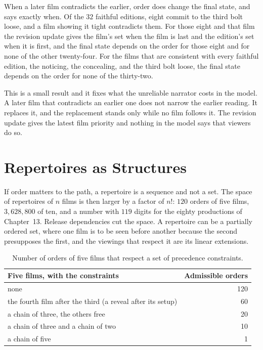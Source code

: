 \documentclass[11pt,twoside,openright]{book}
\theoremstyle{plain}
\theoremstyle{definition}
\theoremstyle{remark}
\begin{document}
When a later film contradicts the earlier, order does change the final state, and  says exactly when. Of the $32$ faithful editions, eight commit to the third bolt loose, and a film showing it tight contradicts them. For those eight and that film the revision update gives the film's set when the film is last and the edition's set when it is first, and the final state depends on the order for those eight and for none of the other twenty-four. For the films that are consistent with every faithful edition, the noticing, the concealing, and the third bolt loose, the final state depends on the order for none of the thirty-two.

This is a small result and it fixes what the unreliable narrator costs in the model. A later film that contradicts an earlier one does not narrow the earlier reading. It replaces it, and the replacement stands only while no film follows it. The revision update gives the latest film priority and nothing in the model says that viewers do so.

\section{Repertoires as Structures}\label{sec:struct14}

If order matters to the path, a repertoire is a sequence and not a set. The space of repertoires of $n$ films is then larger by a factor of $n!$: $120$ orders of five films, $3{,}628{,}800$ of ten, and a number with $119$ digits for the eighty productions of Chapter~13. Release dependencies cut the space. A repertoire can be a partially ordered set, where one film is to be seen before another because the second presupposes the first, and the viewings that respect it are its linear extensions.

\begin{table}[ht]
\centering
\begin{tabular}{@{}lr@{}}
\toprule
Five films, with the constraints & Admissible orders\\
\midrule
none & 120\\
the fourth film after the third (a reveal after its setup) & 60\\
a chain of three, the others free & 20\\
a chain of three and a chain of two & 10\\
a chain of five & 1\\
\bottomrule
\end{tabular}
\caption{Number of orders of five films that respect a set of precedence constraints.}\label{tab:ext14}
\end{table}
\end{document}
